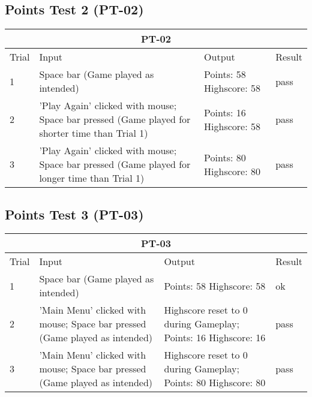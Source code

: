 \documentclass[12pt, titlepage]{article}
\begin{document}
\subsection{Points Test 2 (PT-02)}
\begin{tabular}{ |p{3cm}||p{3cm}|p{3cm}|p{3cm}|  }
 \hline
 \multicolumn{4}{|c|}{PT-02} \\
 \hline
Trial & Input & Output & Result\\
 \hline
1 & Space bar (Game played as intended) & Points: 58  Highscore: 58 &  pass\\
\midrule
2 & 'Play Again' clicked with mouse; Space bar pressed (Game played for shorter time than Trial 1) & Points: 16 Highscore: 58 & pass\\
\midrule
3 & 'Play Again' clicked with mouse; Space bar pressed (Game played for longer time than Trial 1) & Points: 80 Highscore: 80 & pass\\
 \hline
\end{tabular}

\subsection{Points Test 3 (PT-03)}
\begin{tabular}{ |p{3cm}||p{3cm}|p{3cm}|p{3cm}|  }
 \hline
 \multicolumn{4}{|c|}{PT-03} \\
 \hline
Trial & Input & Output & Result\\
 \hline
1 & Space bar (Game played as intended) & Points: 58  Highscore: 58 &  ok\\
\midrule
2 & 'Main Menu' clicked with mouse; Space bar pressed (Game played as intended) & Highscore reset to 0 during Gameplay; Points: 16  Highscore: 16 & pass\\
\midrule
3 & 'Main Menu' clicked with mouse; Space bar pressed (Game played as intended) & Highscore reset to 0 during Gameplay; Points: 80 Highscore: 80 & pass\\
 \hline
\end{tabular}
\end{document}
